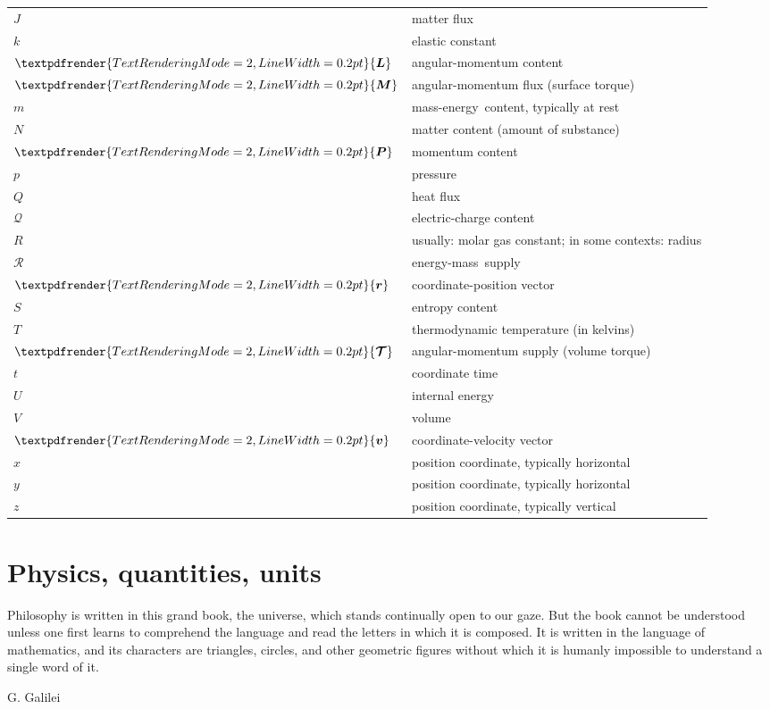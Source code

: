\documentclass[a4paper,12pt,%
onecolumn,oneside,%
british%
]{memoir}
\renewcommand*{\bm}[1]{\textpdfrender{TextRenderingMode=2,LineWidth=0.2pt}{\boldsymbol{#1}}}
\renewcommand*{\|}[1][]{\nonscript\:#1\vert\nonscript\:\mathopen{}}
\newcommand*{\energym}{energy-mass}
\newcommand*{\masse}{mass-energy}
\newcommand*{\yr}{\bm{r}}
\newcommand*{\yv}{\bm{v}}
\newcommand*{\yN}{N}
\newcommand*{\yJ}{J}
\newcommand*{\ym}{m}%
\newcommand*{\yU}{U}
\newcommand*{\yQ}{Q}%
\newcommand*{\yR}{\mathcal{R}}%
\newcommand*{\yP}{\bm{P}}
\newcommand*{\yL}{\bm{L}}%
\newcommand*{\yM}{\bm{M}}%
\newcommand*{\ytoo}{\mathcal{T}}%
\newcommand*{\yto}{\bm{\ytoo}}%
\newcommand*{\yS}{S}
\newcommand*{\yT}{T}%
\newcommand*{\yC}{\mathcal{Q}}
\begin{document}
\begin{table}[p]
\begin{tabularx}{1.0\linewidth}{ll}
    $\yJ$ & matter flux
    \\
    $k$ & elastic constant
    \\
    $\yL$ & angular-momentum content
    \\
    $\yM$ & angular-momentum flux (surface torque)
    \\
    $\ym$ & \masse\ content, typically at rest
    \\
    $\yN$ & matter content (amount of substance)
    \\
    $\yP$ & momentum content
    \\
    $p$ & pressure
    \\
    $\yQ$ & heat flux
    \\
    $\yC$ & electric-charge content
    \\
    $R$ & usually: molar gas constant; in some contexts: radius
    \\
    $\yR$ & \energym\ supply
    \\
    $\yr$ & coordinate-position vector
    \\
    $\yS$ & entropy content
    \\
    $\yT$ & thermodynamic temperature (in kelvins)
    \\
    $\yto$ & angular-momentum supply (volume torque)
    \\
    $t$ & coordinate time
    \\
    $\yU$ & internal energy
    \\
    $V$ & volume
    \\
    $\yv$ & coordinate-velocity vector
    \\
    $x$ & position coordinate, typically horizontal
    \\
    $y$ & position coordinate, typically horizontal
    \\
    $z$ & position coordinate, typically vertical
  \end{tabularx}
\end{table}


\printpagenotes*
\cleartooddpage
\chapter{Physics, quantities, units}
\label{cha:physics_quantities_units}

\epigraph{Philosophy is written in this grand book, the universe, which stands continually open to our gaze. But the book cannot be understood unless one first learns to comprehend the language and read the letters in which it is composed. It is written in the language of mathematics, and its characters are triangles, circles, and other geometric figures without which it is humanly impossible to understand a single word of it.}{G. Galilei \cites*{galilei1623}}
\end{document}
